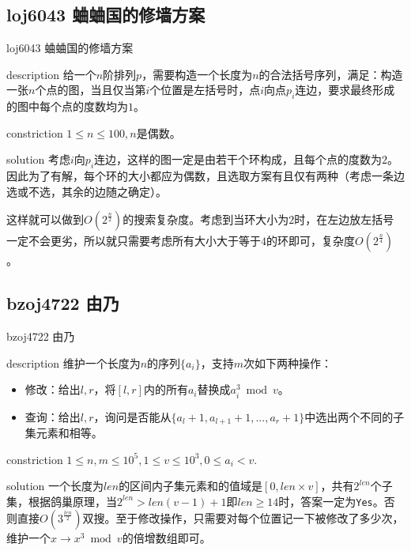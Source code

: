 \documentclass{beamer}
\begin{document}
	\subsection{loj6043 蛐蛐国的修墙方案}
	\begin{frame}{loj6043 蛐蛐国的修墙方案}
		\begin{block}{description}
			给一个$n$阶排列$p$，需要构造一个长度为$n$的合法括号序列，满足：构造一张$n$个点的图，当且仅当第$i$个位置是左括号时，点$i$向点$p_i$连边，要求最终形成的图中每个点的度数均为$1$。
		\end{block}
		\begin{block}{constriction}
			$1 \le n \le 100, n$是偶数。
		\end{block}
		\pause
		\begin{block}{solution}
			考虑$i$向$p_i$连边，这样的图一定是由若干个环构成，且每个点的度数为$2$。因此为了有解，每个环的大小都应为偶数，且选取方案有且仅有两种（考虑一条边选或不选，其余的边随之确定）。
			
			这样就可以做到$O(2^{\frac n2})$的搜索复杂度。考虑到当环大小为$2$时，在左边放左括号一定不会更劣，所以就只需要考虑所有大小大于等于$4$的环即可，复杂度$O(2^{\frac n4})$。
		\end{block}
	\end{frame}
	\subsection{bzoj4722 由乃}
	\begin{frame}{bzoj4722 由乃}
		\begin{block}{description}
			维护一个长度为$n$的序列$\{a_i\}$，支持$m$次如下两种操作：
			
			\begin{itemize}
				\item 修改：给出$l,r$，将$[l,r]$内的所有$a_i$替换成$a_i^3 \bmod v$。
				\item 查询：给出$l,r$，询问是否能从$\{a_l+1,a_{l+1}+1,...,a_r+1\}$中选出两个不同的子集元素和相等。
			\end{itemize}
		\end{block}
		\begin{block}{constriction}
			$1 \le n, m \le 10^5, 1 \le v \le 10^3, 0 \le a_i < v.$
		\end{block}
		\pause
		\begin{block}{solution}
			一个长度为$len$的区间内子集元素和的值域是$[0,len\times v]$，共有$2^{len}$个子集，根据鸽巢原理，当$2^{len}>len(v-1)+1$即$len\ge 14$时，答案一定为\texttt{Yes}。否则直接$O(3^{\frac{len}{2}})$双搜。至于修改操作，只需要对每个位置记一下被修改了多少次，维护一个$x \to x^3 \bmod v$的倍增数组即可。
		\end{block}
	\end{frame}
\end{document}
